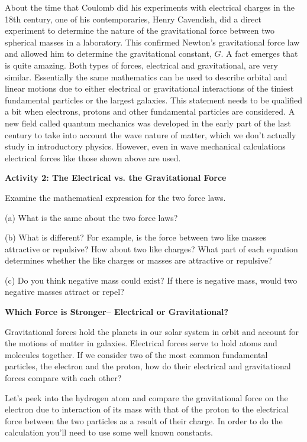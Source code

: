About the time that Coulomb did his experiments with electrical charges in the
18th century, one of his contemporaries, Henry Cavendish, did a direct experiment
to determine the nature of the gravitational force between two spherical masses
in a laboratory. This confirmed Newton's gravitational force law and allowed
him to determine the gravitational constant, $G$. A fact emerges that is quite
amazing. Both types of forces, electrical and gravitational, are very similar.
Essentially the same mathematics can be used to describe orbital and linear
motions due to either electrical or gravitational interactions of the tiniest
fundamental particles or the largest galaxies. This statement needs to be qualified
a bit when electrons, protons and other fundamental particles are considered.
A new field called quantum mechanics was developed in the early part of the
last
century to take into account the wave nature of matter, which we don't actually
study in introductory physics. However, even in wave mechanical calculations
electrical forces like those shown above are used. 

\textbf{Activity 2: The Electrical vs. the Gravitational Force} 

Examine the mathematical expression for the two force laws.

(a) What is the same about the two force laws?
\vspace{20mm}

(b) What is different? For example, is the force between two like masses attractive
or repulsive? How about two like charges? What part of each equation determines
whether the like charges or masses are attractive or repulsive?
\vspace{20mm}

(c) Do you think negative mass could exist? If there is negative mass, would
two negative masses attract or repel?
\vspace{20mm}

\textbf{Which Force is Stronger-- Electrical or Gravitational?} 

Gravitational forces hold the planets in our solar system in orbit and account
for the motions of matter in galaxies. Electrical forces serve to hold atoms
and molecules together. If we consider two of the most common fundamental particles,
the electron and the proton, how do their electrical and gravitational forces
compare with each other?

Let's peek into the hydrogen atom and compare the gravitational force on the
electron due to interaction of its mass with that of the proton to the electrical
force between the two particles as a result of their charge. In order to do
the calculation you'll need to use some well known constants.

